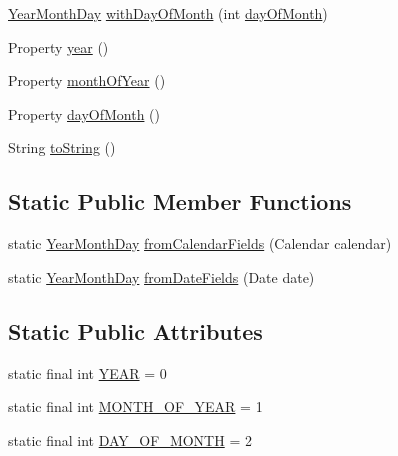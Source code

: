 \begin{DoxyCompactItemize}
\item 
\hyperlink{classorg_1_1joda_1_1time_1_1_year_month_day}{Year\-Month\-Day} \hyperlink{classorg_1_1joda_1_1time_1_1_year_month_day_a6599744967a15f29ae9eb21c79d9f91b}{with\-Day\-Of\-Month} (int \hyperlink{classorg_1_1joda_1_1time_1_1_year_month_day_a2f45a92b2d04d614dabb6d78d9d97e8a}{day\-Of\-Month})
\item 
Property \hyperlink{classorg_1_1joda_1_1time_1_1_year_month_day_a0d4c3130ad3599f58c06b44b0cc3bb40}{year} ()
\item 
Property \hyperlink{classorg_1_1joda_1_1time_1_1_year_month_day_aee12513f0a474e8f9d986f3b3b5c8f82}{month\-Of\-Year} ()
\item 
Property \hyperlink{classorg_1_1joda_1_1time_1_1_year_month_day_a2f45a92b2d04d614dabb6d78d9d97e8a}{day\-Of\-Month} ()
\item 
String \hyperlink{classorg_1_1joda_1_1time_1_1_year_month_day_a22f636d8067a0c66e0199be7d5fb738c}{to\-String} ()
\end{DoxyCompactItemize}
\subsection*{Static Public Member Functions}
\begin{DoxyCompactItemize}
\item 
static \hyperlink{classorg_1_1joda_1_1time_1_1_year_month_day}{Year\-Month\-Day} \hyperlink{classorg_1_1joda_1_1time_1_1_year_month_day_a49fb89bd2539d003775726e2834192fe}{from\-Calendar\-Fields} (Calendar calendar)
\item 
static \hyperlink{classorg_1_1joda_1_1time_1_1_year_month_day}{Year\-Month\-Day} \hyperlink{classorg_1_1joda_1_1time_1_1_year_month_day_a6a2b3737f042e48263e4fadacfb52468}{from\-Date\-Fields} (Date date)
\end{DoxyCompactItemize}
\subsection*{Static Public Attributes}
\begin{DoxyCompactItemize}
\item 
static final int \hyperlink{classorg_1_1joda_1_1time_1_1_year_month_day_a246b2a0db1ccba5ca9fce1046b1e0192}{Y\-E\-A\-R} = 0
\item 
static final int \hyperlink{classorg_1_1joda_1_1time_1_1_year_month_day_aa22dd68635327b3930f225cd3803b4f7}{M\-O\-N\-T\-H\-\_\-\-O\-F\-\_\-\-Y\-E\-A\-R} = 1
\item 
static final int \hyperlink{classorg_1_1joda_1_1time_1_1_year_month_day_a09237fdcc4215cb4ea13c8d15137ae59}{D\-A\-Y\-\_\-\-O\-F\-\_\-\-M\-O\-N\-T\-H} = 2
\end{DoxyCompactItemize}
